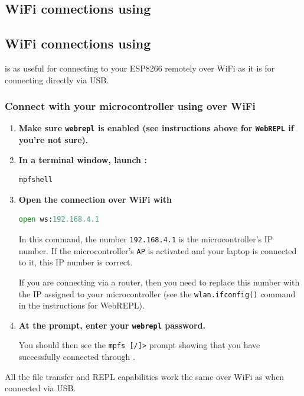 \subsection{\color{gray}WiFi connections using \thonny\color{black}}

\subsection{WiFi connections using \mpfshell}
\mpfshell is as useful for connecting to your ESP8266 remotely over WiFi as it is for connecting directly via USB.

\subsubsection{\howto Connect with your microcontroller using \mpfshell over WiFi}
\begin{enumerate}
	\item \textbf{Make sure \texttt{webrepl} is enabled (see instructions above for \texttt{WebREPL} if you're not sure).}
	\item \textbf{In a terminal window, launch \mpfshell:}
\begin{lstlisting}[language=Python]
mpfshell
\end{lstlisting}
	\item \textbf{Open the connection over WiFi with}
\begin{lstlisting}[language=Python]
open ws:192.168.4.1
\end{lstlisting}

	In this command, the number \texttt{192.168.4.1} is the microcontroller's IP number.
	If the microcontroller's \texttt{AP} is activated and your laptop is connected to it, this IP number is correct.

	If you are connecting via a router, then you need to replace this number with the IP assigned to your microcontroller (see the \texttt{wlan.ifconfig()} command in the instructions for WebREPL).

	\item \textbf{At the prompt, enter your \texttt{webrepl} password.}

	You should then see the \verb|mpfs [/]>| prompt showing that you have successfully connected through \mpfshell.
\end{enumerate}

All the \mpfshell file transfer and REPL capabilities work the same over WiFi as when connected via USB.



